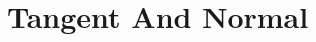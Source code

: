 \documentclass[11pt]{book}
\begin{document}
\chapter{Tangent And Normal}


%
%
%
%
%
%
%
%
\end{document}
